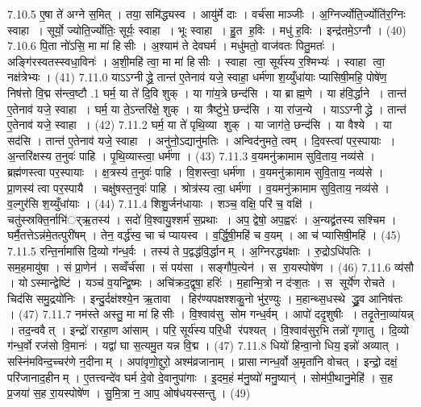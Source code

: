7.10.5
ए॒षा ते॑ अग्ने स॒मित् । तया॒ समि॑द्ध्यस्व । आयु॑र्मे दाः । वर्च॑सा माञ्जीः । अ॒ग्निर्ज्योति॒र्ज्योति॑र॒ग्निः स्वाहा । सूर्यो॒ ज्योति॒र्ज्योतिः॒ सूर्यः॒ स्वाहा । भूः स्वाहा । हु॒त ह॒विः । मधु॑ ह॒विः । इन्द्र॑तमे॒ऽग्नौ । (40)
7.10.6
पि॒ता नो॑ऽसि॒ मा मा॑ हिसीः । अ॒श्याम॑ ते देवघर्म । मधु॑मतो॒ वाज॑वतः पितु॒मतः॑ । अङ्गि॑रस्वतस्स्वधा॒विनः॑ । अ॒शी॒महि॑ त्वा॒ मा मा॑ हिसीः । स्वाहा त्वा॒ सूर्य॑स्य र॒श्मिभ्यः॑ । स्वाहा त्वा॒ नक्ष॑त्रेभ्यः । (41)
7.11.0
याऽऽग्नीद्ध्रे॒ तान्त॑ ए॒तेनाव॑ यजे॒ स्वाहा॒ धर्म॑णा श॒य्युँधा॑याः प्यासिषी॒महि॒ पोषे॑ण॒ निष॑त्तो वि॒द्म स॑न्त्व॒ष्टौ
.1
घर्म॒ या ते॑ दि॒वि शुक् । या गा॑य॒त्रे छन्द॑सि । या ब्राह्म॒णे । या ह॑वि॒र्द्धाने । तान्त॑ ए॒तेनाव॑ यजे॒ स्वाहा । घर्म॒ या ते॒ऽन्तरि॑क्षे॒ शुक् । या त्रैष्टु॑भे॒ छन्द॑सि । या रा॑ज॒न्ये । याऽऽग्नीद्ध्रे । तान्त॑ ए॒तेनाव॑ यजे॒ स्वाहा । (42)
7.11.2
घर्म॒ या ते॑ पृथि॒व्या शुक् । या जाग॑ते॒ छन्द॑सि । या वैश्ये । या सद॑सि । तान्त॑ ए॒तेनाव॑ यजे॒ स्वाहा । अनु॑नो॒ऽद्यानु॑मतिः । अन्विद॑नुमते॒ त्वम् । दि॒वस्त्वा॑ पर॒स्पायाः । अ॒न्तरि॑क्षस्य त॒नुवः॑ पाहि । पृ॒थि॒व्यास्त्वा॒ धर्म॑णा । (43)
7.11.3
व॒यमनु॑क्रामाम सुवि॒ताय॒ नव्य॑से । ब्रह्म॑णस्त्वा पर॒स्पायाः । क्ष॒त्रस्य॑ त॒नुवः॑ पाहि । वि॒शस्त्वा॒ धर्म॑णा । व॒यमनु॑क्रामाम सुवि॒ताय॒ नव्य॑से । प्रा॒णस्य॑ त्वा पर॒स्पायै । चक्षु॑षस्त॒नुवः॑ पाहि । श्रोत्र॑स्य त्वा॒ धर्म॑णा । व॒यमनु॑क्रामाम सुवि॒ताय॒ नव्य॑से । व॒ल्गुर॑सि श॒य्युँधा॑याः । (44)
7.11.4
शिशु॒र्जन॑धायाः । शञ्च॒ वक्षि॒ परि॑ च॒ वक्षि॑ । चतु॑स्स्रक्ति॒र्नाभि॑र््ऋ॒तस्य॑ । सदो॑ वि॒श्वायु॒श्शर्म॑ स॒प्रथाः । अप॒ द्वेषो॒ अप॒ह्वरः॑ । अ॒न्यद्व्र॑तस्य सश्चिम । घर्मै॒तत्तेऽन्न॑मे॒तत्पुरी॑षम् । तेन॒ वर्द्ध॑स्व॒ चा च॑ प्यायस्व । व॒र्द्धि॒षी॒महि॑ च व॒यम् । आ च॑ प्यासिषी॒महि॑ । (45)
7.11.5
रन्ति॒र्नामा॑सि दि॒व्यो ग॑न्ध॒र्वः । तस्य॑ ते प॒द्वद्ध॑वि॒र्द्धानम् । अ॒ग्निरद्ध्य॑क्षाः । रु॒द्रोऽधि॑पतिः । सम॒हमायु॑षा । सं प्रा॒णेन॑ । सव्वँर्च॑सा । सं पय॑सा । सङ्गौ॑प॒त्येन॑ । स रा॒यस्पोषे॑ण । (46)
7.11.6
व्य॑सौ । योऽस्मान्द्वेष्टि॑ । यञ्च॑ व॒यन्द्वि॒ष्मः । अचि॑क्रद॒द्वृषा॒ हरिः॑ । म॒हान्मि॒त्रो न द॑ऱ्श॒तः । स सूर्ये॑ण रोचते । चिद॑सि समु॒द्रयो॑निः । इन्दु॒र्दक्ष॑श्श्ये॒न ऋ॒तावा । हिर॑ण्यपक्षश्शकु॒नो भु॑र॒ण्युः । म॒हान्थ्स॒धस्थे द्ध्रु॒व आनिष॑त्तः । (47)
7.11.7
नम॑स्ते अस्तु॒ मा मा॑ हिसीः । वि॒श्वाव॑सु सोम गन्ध॒र्वम् । आपो॑ ददृ॒शुषीः । तदृ॒तेना॒व्या॑यन्न् । तद॒न्ववैत् । इन्द्रो॑ रारहा॒ण आ॑साम् । परि॒ सूर्य॑स्य परि॒धी र॑पश्यत् । वि॒श्वाव॑सुर॒भि तन्नो॑ गृणातु । दि॒व्यो ग॑न्ध॒र्वो रज॑सो वि॒मानः॑ । यद्वा॑ घा स॒त्यमु॒त यन्न वि॒द्म । (47)
7.11.8
धियो॑ हिन्वा॒नो धिय॒ इन्नो॑ अव्यात् । सस्नि॑मविन्द॒च्चर॑णे न॒दीनाम् । अपा॑वृणो॒द्दुरो॒ अश्म॑व्रजानाम् । प्रासान्गन्ध॒र्वो अ॒मृता॑नि वोचत् । इन्द्रो॒ दक्षं॒ परि॑जानाद॒हीनम् । ए॒तत्त्वन्दे॑व घर्म दे॒वो दे॒वानुपा॑गाः । इ॒दम॒हं म॑नु॒ष्यो॑ मनु॒ष्यान्॑ । सोम॑पी॒थानु॒मेहि॑ । स॒ह प्र॒जया॑ स॒ह रा॒यस्पोषे॑ण । सु॒मि॒त्रा न॒ आप॒ ओष॑धयस्सन्तु । (49)
